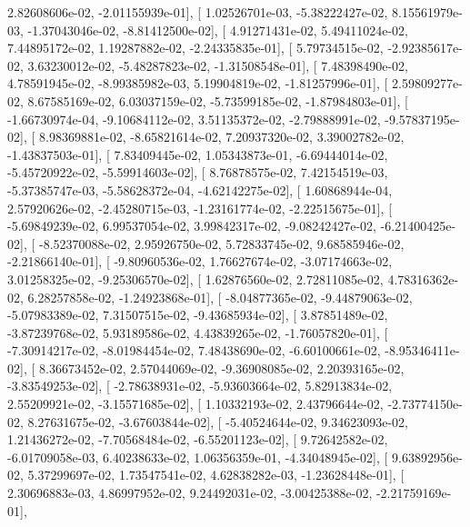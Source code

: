 \documentclass{article}
\begin{document}
          2.82608606e-02,  -2.01155939e-01],
       [  1.02526701e-03,  -5.38222427e-02,   8.15561979e-03,
         -1.37043046e-02,  -8.81412500e-02],
       [  4.91271431e-02,   5.49411024e-02,   7.44895172e-02,
          1.19287882e-02,  -2.24335835e-01],
       [  5.79734515e-02,  -2.92385617e-02,   3.63230012e-02,
         -5.48287823e-02,  -1.31508548e-01],
       [  7.48398490e-02,   4.78591945e-02,  -8.99385982e-03,
          5.19904819e-02,  -1.81257996e-01],
       [  2.59809277e-02,   8.67585169e-02,   6.03037159e-02,
         -5.73599185e-02,  -1.87984803e-01],
       [ -1.66730974e-04,  -9.10684112e-02,   3.51135372e-02,
         -2.79888991e-02,  -9.57837195e-02],
       [  8.98369881e-02,  -8.65821614e-02,   7.20937320e-02,
          3.39002782e-02,  -1.43837503e-01],
       [  7.83409445e-02,   1.05343873e-01,  -6.69444014e-02,
         -5.45720922e-02,  -5.59914603e-02],
       [  8.76878575e-02,   7.42154519e-03,  -5.37385747e-03,
         -5.58628372e-04,  -4.62142275e-02],
       [  1.60868944e-04,   2.57920626e-02,  -2.45280715e-03,
         -1.23161774e-02,  -2.22515675e-01],
       [ -5.69849239e-02,   6.99537054e-02,   3.99842317e-02,
         -9.08242427e-02,  -6.21400425e-02],
       [ -8.52370088e-02,   2.95926750e-02,   5.72833745e-02,
          9.68585946e-02,  -2.21866140e-01],
       [ -9.80960536e-02,   1.76627674e-02,  -3.07174663e-02,
          3.01258325e-02,  -9.25306570e-02],
       [  1.62876560e-02,   2.72811085e-02,   4.78316362e-02,
          6.28257858e-02,  -1.24923868e-01],
       [ -8.04877365e-02,  -9.44879063e-02,  -5.07983389e-02,
          7.31507515e-02,  -9.43685934e-02],
       [  3.87851489e-02,  -3.87239768e-02,   5.93189586e-02,
          4.43839265e-02,  -1.76057820e-01],
       [ -7.30914217e-02,  -8.01984454e-02,   7.48438690e-02,
         -6.60100661e-02,  -8.95346411e-02],
       [  8.36673452e-02,   2.57044069e-02,  -9.36908085e-02,
          2.20393165e-02,  -3.83549253e-02],
       [ -2.78638931e-02,  -5.93603664e-02,   5.82913834e-02,
          2.55209921e-02,  -3.15571685e-02],
       [  1.10332193e-02,   2.43796644e-02,  -2.73774150e-02,
          8.27631675e-02,  -3.67603844e-02],
       [ -5.40524644e-02,   9.34623093e-02,   1.21436272e-02,
         -7.70568484e-02,  -6.55201123e-02],
       [  9.72642582e-02,  -6.01709058e-03,   6.40238633e-02,
          1.06356359e-01,  -4.34048945e-02],
       [  9.63892956e-02,   5.37299697e-02,   1.73547541e-02,
          4.62838282e-03,  -1.23628448e-01],
       [  2.30696883e-03,   4.86997952e-02,   9.24492031e-02,
         -3.00425388e-02,  -2.21759169e-01],
\end{document}
